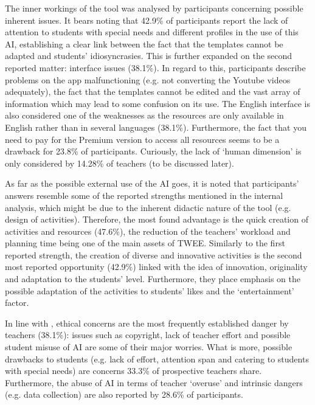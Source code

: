 \label{sub-sub-sub-sec-weaknesses}

The inner workings of the tool was analysed by participants concerning
possible inherent issues. It bears noting that 42.9\% of participants
report the lack of attention to students with special needs and
different profiles in the use of this AI, establishing a clear link
between the fact that the templates cannot be adapted and students'
idiosyncrasies. This is further expanded on the second reported matter:
interface issues (38.1\%). In regard to this, participants describe
problems on the app malfunctioning (e.g. not converting the Youtube
videos adequately), the fact that the templates cannot be edited and the
vast array of information which may lead to some confusion on its use.
The English interface is also considered one of the weaknesses as the
resources are only available in English rather than in several languages
(38.1\%). Furthermore, the fact that you need to pay for the Premium
version to access all resources seems to be a drawback for 23.8\% of
participants. Curiously, the lack of `human dimension' is only
considered by 14.28\% of teachers (to be discussed later).

\label{sub-sub-sub-sec-opportunites}

As far as the possible external use of the AI goes, it is noted that
participants' answers resemble some of the reported strengths mentioned
in the internal analysis, which might be due to the inherent didactic
nature of the tool (e.g. design of activities). Therefore, the most
found advantage is the quick creation of activities and resources
(47.6\%), the reduction of the teachers' workload and planning time
being one of the main assets of TWEE. Similarly to the first reported
strength, the creation of diverse and innovative activities is the
second most reported opportunity (42.9\%) linked with the idea of
innovation, originality and adaptation to the students' level.
Furthermore, they place emphasis on the possible adaptation of the
activities to students' likes and the `entertainment' factor.

\label{sub-sub-sub-sec-threats}

In line with \textcite{rodrigues2023}, ethical concerns are the
most frequently established danger by teachers (38.1\%): issues such as
copyright, lack of teacher effort and possible student misuse of AI are
some of their major worries. What is more, possible drawbacks to
students (e.g. lack of effort, attention span and catering to students
with special needs) are concerns 33.3\% of prospective teachers share.
Furthermore, the abuse of AI in terms of teacher `overuse' and intrinsic
dangers (e.g. data collection) are also reported by 28.6\% of
participants.

